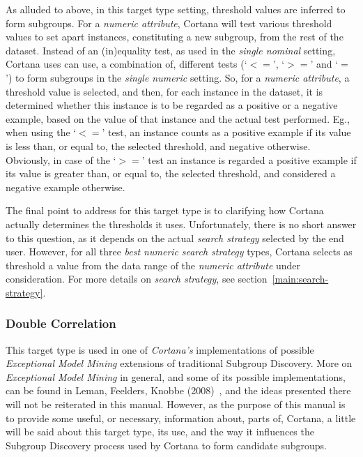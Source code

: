\documentclass{article}
\begin{document}
As alluded to above, in this target type setting, threshold values are inferred to form subgroups.
For a \emph{numeric attribute}, Cortana will test various threshold values to set apart instances, constituting a new subgroup, from the rest of the dataset.
Instead of an (in)equality test, as used in the \emph{single nominal} setting, Cortana uses can use, a combination of, different tests (`$<=$', `$>=$' and `$=$') to form subgroups in the \emph{single numeric} setting.
So, for a \emph{numeric attribute}, a threshold value is selected, and then, for each instance in the dataset, it is determined whether this instance is to be regarded as a positive or a negative example, based on the value of that instance and the actual test performed.
Eg., when using the `$<=$' test, an instance counts as a positive example if its value is less than, or equal to, the selected threshold, and negative otherwise.
Obviously, in case of the `$>=$' test an instance is regarded a positive example if its value is greater than, or equal to, the selected threshold, and considered a negative example otherwise.

The final point to address for this target type is to clarifying how Cortana actually determines the thresholds it uses.
Unfortunately, there is no short answer to this question, as it depends on the actual \emph{search strategy} selected by the end user.
However, for all three \emph{best numeric} \emph{search strategy} types, Cortana selects as threshold a value from the data range of the \emph{numeric attribute} under consideration.
For more details on \emph{search strategy}, see section~\ref{main:search-strategy}.

\subsubsection{Double Correlation}
This target type is used in one of \emph{Cortana's} implementations of possible \emph{Exceptional Model Mining} extensions of traditional Subgroup Discovery.
More on \emph{Exceptional Model Mining} in general, and some of its possible implementations, can be found in Leman, Feelders, Knobbe (2008)~\cite{emm}, and the ideas presented there will not be reiterated in this manual.
However, as the purpose of this manual is to provide some useful, or necessary, information about, parts of,  Cortana, a little will be said about this target type, its use, and the way it influences the Subgroup Discovery process used by Cortana to form candidate subgroups.
\end{document}
